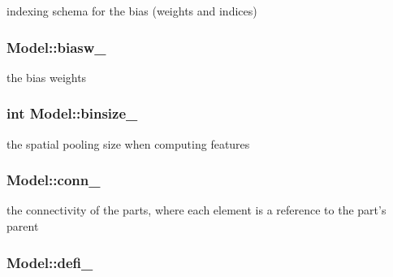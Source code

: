 indexing schema for the bias (weights and indices) 

\hypertarget{class_model_ab870c45d7637a43ba73c81cc4080a497}{
\subsubsection[{biasw\-\_\-}]{ Model\-::biasw\-\_\-\hspace{0.3cm}{\ttfamily [protected]}}}\label{class_model_ab870c45d7637a43ba73c81cc4080a497}


the bias weights 

\hypertarget{class_model_af34c4284d739cac02812d76eaa231679}{
\subsubsection[{binsize\-\_\-}]{\setlength{\rightskip}{0pt plus 5cm}int Model\-::binsize\-\_\-\hspace{0.3cm}{\ttfamily [protected]}}}\label{class_model_af34c4284d739cac02812d76eaa231679}


the spatial pooling size when computing features 

\hypertarget{class_model_a976b10b7048b41203eae19c141654abf}{
\subsubsection[{conn\-\_\-}]{ Model\-::conn\-\_\-\hspace{0.3cm}{\ttfamily [protected]}}}\label{class_model_a976b10b7048b41203eae19c141654abf}


the connectivity of the parts, where each element is a reference to the part's parent 

\hypertarget{class_model_a477df0e7641f38782085d0a425625d12}{
\subsubsection[{defi\-\_\-}]{ Model\-::defi\-\_\-\hspace{0.3cm}{\ttfamily [protected]}}}\label{class_model_a477df0e7641f38782085d0a425625d12}


